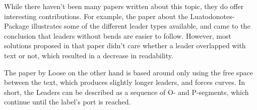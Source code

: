 \documentclass[11pt,a4paper]{article}
\begin{document}
While there haven't been many papers written about this topic, they do offer interesting contributions. For example, the paper about the Luatodonotes-Package\cite{Kindermann2014} illustrates some of the different leader types available, and came to the conclusion that leaders without bends are easier to follow. %
However, most solutions proposed in that paper didn't care whether a leader overlapped with text or not, which resulted in a decrease in readability.

The paper by Loose\cite{Loose2015} on the other hand is based around only using the free space between the text, which produces slightly longer leaders, and forces curves. In short, the Leaders can be described as a sequence of O- and P-segments, which continue until the label's port is reached. %







\end{document}
